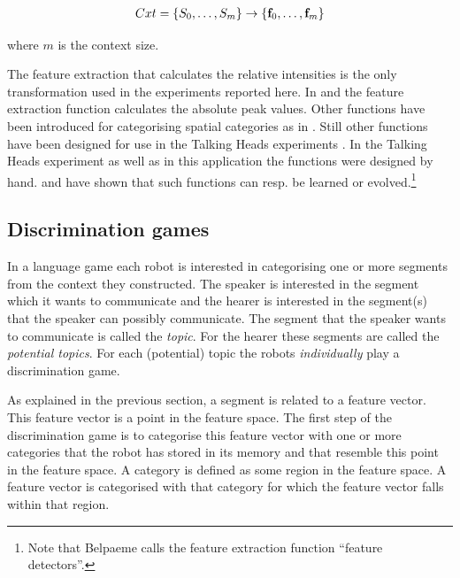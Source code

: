 \begin{eqnarray}
Cxt=\{S_0,\ldots,S_m\} \rightarrow \{{\bf f}_0,\ldots,{\bf f}_m\}
\end{eqnarray}


where $m$ is the context size.

The feature extraction that calculates the relative intensities is the only transformation used in the experiments reported here. In \citealt{steelsvogt:1997} and \citealt{vogt:1998b} the feature extraction function calculates the absolute peak values. Other functions have been introduced for categorising spatial categories as in \citealt{steels:1996d}. Still other functions have been designed for use in the Talking Heads experiments \citep{belpaeme:1998,steelskaplan:1999}. In the Talking Heads experiment as well as in this application the functions were designed by hand. \citet{dejong:1999} and \citet{belpaeme:1999} have shown that such functions can resp. be learned or evolved.\footnote{Note that Belpaeme calls the feature extraction function ``feature detectors''.}


\subsection{Discrimination games}\label{s:cm:dg}



In a language game each robot is interested in categorising one or more segments from the context they constructed. The speaker is interested in the segment which it wants to communicate and the hearer is interested in the segment(s) that the speaker can possibly communicate. The segment that the speaker wants to communicate is called the {\em topic}. For the hearer these segments are called the {\em potential topics}. For each (potential) topic the robots {\em individually} play a discrimination game.

As explained in the previous section, a segment is related to a feature vector. This feature vector is a point in the feature space. The first step of the discrimination game is to categorise this feature vector with one or more categories that the robot has stored in its memory and that resemble this point in the feature space. A category is defined as some region in the feature space. A feature vector is categorised with that category for which the feature vector falls within that region.

